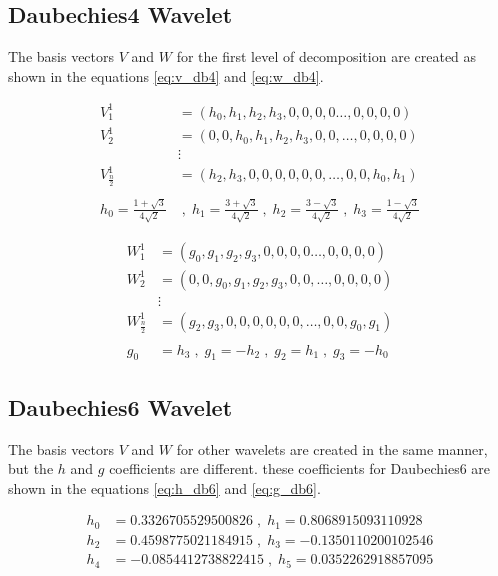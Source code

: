 \documentclass[12pt]{article}
\begin{document}
	\subsection{Daubechies4 Wavelet}
	
	The basis vectors $V$ and $W$ for the first level of decomposition are created as shown in the equations \ref{eq:v_db4} and \ref{eq:w_db4}.
	
	\begin{equation}
		\begin{aligned}
			V_1^1 &= (h_0, h_1, h_2, h_3, 0, 0, 0, 0 \dots, 0, 0, 0, 0) \\
			V_2^1 &= (0, 0, h_0, h_1, h_2, h_3, 0, 0, \dots, 0, 0, 0, 0) \\
			&\vdots \\
			V_{\frac{n}{2}}^1 &= (h_2, h_3 ,0 ,0 ,0 ,0, 0, 0, \dots, 0, 0, h_0, h_1)\\
			\\
			h_0 = \frac{1+\sqrt3}{4\sqrt{2}}& \;,\; h_1 = \frac{3+\sqrt3}{4\sqrt{2}} \;,\; h_2 = \frac{3-\sqrt3}{4\sqrt{2}} \;,\; h_3 = \frac{1-\sqrt3}{4\sqrt{2}}
		\end{aligned}
		\label{eq:v_db4}
	\end{equation}
	
	\begin{equation}
		\begin{aligned}
			W_1^1 &= (g_0, g_1, g_2, g_3, 0, 0, 0, 0 \dots, 0, 0, 0, 0) \\
			W_2^1 &= (0, 0, g_0, g_1, g_2, g_3, 0, 0, \dots, 0, 0, 0, 0) \\
			&\vdots \\
			W_{\frac{n}{2}}^1 &= (g_2, g_3 ,0 ,0 ,0 ,0, 0, 0, \dots, 0, 0, g_0, g_1)\\
			\\
			g_0 &= h_3 \;,\; g_1 = -h_2 \;,\; g_2 = h_1 \;,\; g_3 = -h_0
		\end{aligned}
		\label{eq:w_db4}
	\end{equation}
	
	\subsection{Daubechies6 Wavelet}
	
	The basis vectors $V$ and $W$ for other wavelets are created in the same manner, but the  $h$ and $g$ coefficients are different. these coefficients for Daubechies6 are shown in the equations \ref{eq:h_db6} and \ref{eq:g_db6}.
	
	\begin{equation}
		\begin{aligned}
		h_0 &= 0.3326705529500826 \;,\; h_1 = 0.8068915093110928 \\
		h_2 &= 0.4598775021184915 \;,\; h_3 = -0.1350110200102546 \\
		h_4 &= -0.0854412738822415 \;,\; h_5 = 0.0352262918857095
		\end{aligned}
		\label{eq:h_db6}
	\end{equation}
	
\end{document}
